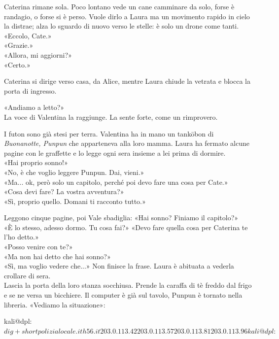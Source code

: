 \par\medskip
Caterina rimane sola. Poco lontano vede un cane camminare da solo, forse \`e randagio, o forse si \`e perso. Vuole dirlo a Laura ma un movimento rapido in cielo la distrae; alza lo sguardo di nuovo verso le stelle: \`e solo un drone come tanti.\\
«Eccolo, Cate.»\\
«Grazie.»\\
«Allora, mi aggiorni?»\\
«Certo.»

\par\medskip
Caterina si dirige verso casa, da Alice, mentre Laura chiude la vetrata e blocca la porta di ingresso.

\par\medskip
«Andiamo a letto?»\\
La voce di Valentina la raggiunge. La sente forte, come un rimprovero.

\par\medskip
I futon sono gi\`a stesi per terra. Valentina ha in mano un tankōbon di \textit{Buonanotte, Punpun} che apparteneva alla loro mamma.  Laura ha fermato alcune pagine con le graffette e lo legge ogni sera insieme a lei prima di dormire.\\
«Hai proprio sonno!»\\
«No, \`e che voglio leggere Punpun. Dai, vieni.»\\
«Ma... ok, per\`o solo un capitolo, perch\'e poi devo fare una cosa per Cate.»\\
«Cosa devi fare? La vostra avventura?»\\
«Sì, proprio quello. Domani ti racconto tutto.»


\par\medskip
Leggono cinque pagine, poi Vale sbadiglia:
«Hai sonno? Finiamo il capitolo?»\\
«\`E lo stesso, adesso dormo. Tu cosa fai?»
«Devo fare quella cosa per Caterina te l'ho detto.»\\
«Posso venire con te?»\\
«Ma non hai detto che hai sonno?»\\
«Sì, ma voglio vedere che...» Non finisce la frase. Laura \`e abituata a vederla crollare di sera.\\
Lascia la porta della loro stanza socchiusa. Prende la caraffa di t\`e freddo dal frigo e se ne versa  un bicchiere. Il computer \`e gi\`a sul tavolo, Punpun \`e tornato nella libreria.
«Vediamo la situazione»:
\begin{terminalbox}
kali@dpl:~$ dig +short polizialocale.ith56.it
203.0.113.42
203.0.113.57
203.0.113.81
203.0.113.96

kali@dpl:~$
\end{terminalbox}


